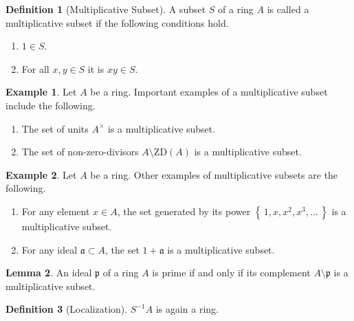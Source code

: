 \documentclass[a4paper]{book}
\theoremstyle{definition}
\newtheorem{definition}{Definition}[]
\newtheorem{example}{Example}[definition]
\newtheorem{lemma}[definition]{Lemma}
\newcommand{\set}[1]{\left\{\, #1 \,\right\}}
\begin{document}
\begin{defbox}
    \begin{definition}[Multiplicative Subset]
        A subset \(S\) of a ring \(A\) is called a multiplicative subset if the following conditions hold.
        \begin{enumerate}
            \item \(1 \in S\).
            \item For all \(x, y \in S\) it is \(xy \in S\).
        \end{enumerate}
    \end{definition}
\end{defbox}

\begin{exmbox}
    \begin{example}
        Let \(A\) be a ring. Important examples of a multiplicative subset include the following.
        \begin{enumerate}
            \item The set of units \(A^\times\) is a multiplicative subset.
            \item The set of non-zero-divisors \(A \setminus \mathrm{ZD}(A)\) is a multiplicative subset.
        \end{enumerate}
    \end{example}
\end{exmbox}

\begin{example}
    Let \(A\) be a ring. Other examples of multiplicative subsets are the following.
    \begin{enumerate}
        \item For any element \(x \in A\), the set generated by its power \(\set{1, x, x^2, x^3, \ldots}\) is a multiplicative subset.
        \item For any ideal \(\mathfrak{a} \subset A\), the set \(1 + \mathfrak{a}\) is a multiplicative subset.
    \end{enumerate}
\end{example}

\begin{thmbox}
    \begin{lemma}
        An ideal \(\mathfrak{p}\) of a ring \(A\) is prime if and only if its complement \(A \setminus \mathfrak{p}\) is a multiplicative subset.
    \end{lemma}
\end{thmbox}

\begin{defbox}
    \begin{definition}[Localization]
        \(S^{-1}A\) is again a ring.
    \end{definition}
\end{defbox}
\end{document}
